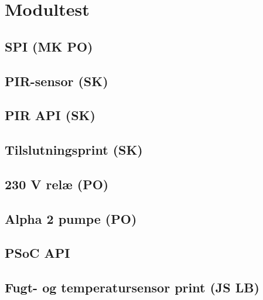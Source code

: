 \chapter{Modultest}

\section{SPI (MK PO)}


\section{PIR-sensor (SK)}


\section{PIR API (SK)}


\section{Tilslutningsprint (SK)}


\section{230 V relæ (PO)}


\section{Alpha 2 pumpe (PO)}


\section{PSoC API}


\section{Fugt- og temperatursensor print (JS LB)}




